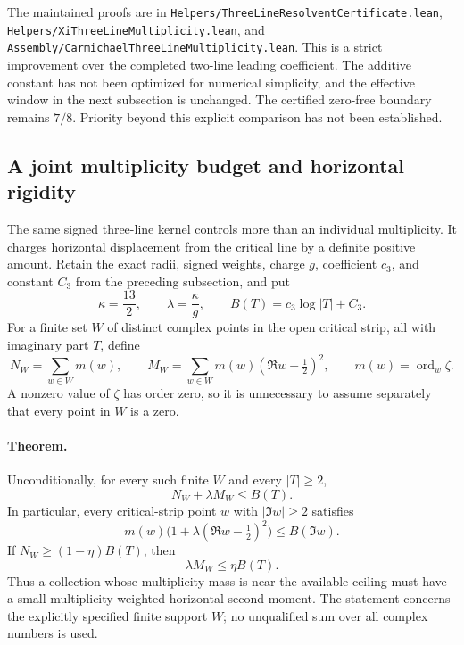 The maintained proofs are in
\texttt{Helpers/ThreeLineResolventCertificate.lean},
\texttt{Helpers/XiThreeLineMultiplicity.lean}, and
\texttt{Assembly/CarmichaelThreeLineMultiplicity.lean}.
This is a strict improvement over the completed two-line leading
coefficient. The additive constant has not been optimized for numerical
simplicity, and the effective window in the next subsection is unchanged.
The certified zero-free boundary remains \(7/8\). Priority beyond this
explicit comparison has not been established.

\subsection{A joint multiplicity budget and horizontal rigidity}
\label{sec:horizontal-multiplicity}

The same signed three-line kernel controls more than an individual
multiplicity.  It charges horizontal displacement from the critical line
by a definite positive amount.  Retain the exact radii, signed weights,
charge \(g\), coefficient \(c_3\), and constant \(C_3\) from the preceding
subsection, and put
\[
 \kappa=\frac{13}{2},\qquad \lambda=\frac{\kappa}{g},\qquad
 B(T)=c_3\log|T|+C_3.
\]
For a finite set \(W\) of distinct complex points in the open critical
strip, all with imaginary part \(T\), define
\[
 N_W=\sum_{w\in W}m(w),\qquad
 M_W=\sum_{w\in W}m(w)(\Re w-\tfrac12)^2,
 \qquad m(w)=\operatorname{ord}_w\zeta.
\]
A nonzero value of \(\zeta\) has order zero, so it is unnecessary to
assume separately that every point in \(W\) is a zero.

\paragraph{Theorem.}
Unconditionally, for every such finite \(W\) and every \(|T|\ge2\),
\begin{equation}
 N_W+\lambda M_W\le B(T).
 \label{eq:horizontal-multiplicity-budget}
\end{equation}
In particular, every critical-strip point \(w\) with \(|\Im w|\ge2\)
satisfies
\begin{equation}
 m(w)\bigl(1+\lambda(\Re w-\tfrac12)^2\bigr)
 \le B(\Im w).
 \label{eq:horizontal-multiplicity-profile}
\end{equation}
If \(N_W\ge(1-\eta)B(T)\), then
\begin{equation}
 \lambda M_W\le\eta B(T).
 \label{eq:horizontal-multiplicity-rigidity}
\end{equation}
Thus a collection whose multiplicity mass is near the available ceiling
must have a small multiplicity-weighted horizontal second moment.
The statement concerns the explicitly specified finite support \(W\);
no unqualified sum over all complex numbers is used.

